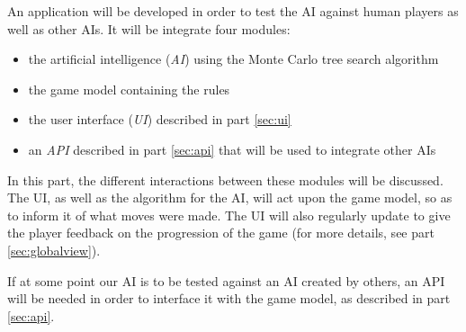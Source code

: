 An application will be developed in order to test the AI against human players as well as other AIs.
It will be integrate four modules: 
\begin{itemize}
\item the artificial intelligence (\emph{AI}) using the Monte Carlo tree search algorithm
\item the game model containing the rules
\item the user interface (\emph{UI}) described in part \ref{sec:ui}
\item an \emph{API} described in part \ref{sec:api} that will be used to integrate other AIs
\end{itemize}

In this part, the different interactions between these modules will be discussed.
The UI, as well as the algorithm for the AI, will act upon the game model, so as to inform it of what moves were made.
The UI will also regularly update to give the player feedback on the progression of the game (for more details, see part \ref{sec:globalview}).

If at some point our AI is to be tested against an AI created by others, an API will be needed in order to interface it with the game model, as described in part \ref{sec:api}.
